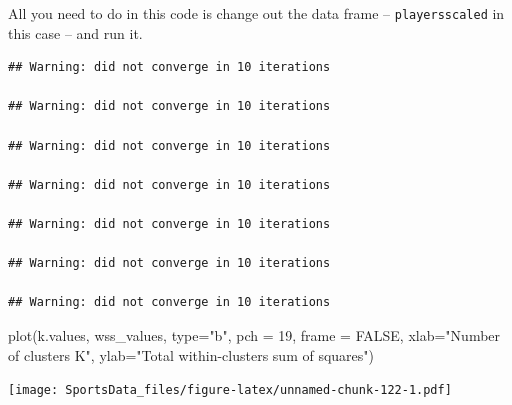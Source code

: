 \documentclass[
]{book}
\newenvironment{Shaded}{\begin{snugshade}}{\end{snugshade}}
\newcommand{\AttributeTok}[1]{\textcolor[rgb]{0.77,0.63,0.00}{#1}}
\newcommand{\CommentTok}[1]{\textcolor[rgb]{0.56,0.35,0.01}{\textit{#1}}}
\newcommand{\ConstantTok}[1]{\textcolor[rgb]{0.00,0.00,0.00}{#1}}
\newcommand{\ControlFlowTok}[1]{\textcolor[rgb]{0.13,0.29,0.53}{\textbf{#1}}}
\newcommand{\DecValTok}[1]{\textcolor[rgb]{0.00,0.00,0.81}{#1}}
\newcommand{\FunctionTok}[1]{\textcolor[rgb]{0.00,0.00,0.00}{#1}}
\newcommand{\NormalTok}[1]{#1}
\newcommand{\OtherTok}[1]{\textcolor[rgb]{0.56,0.35,0.01}{#1}}
\newcommand{\SpecialCharTok}[1]{\textcolor[rgb]{0.00,0.00,0.00}{#1}}
\newcommand{\StringTok}[1]{\textcolor[rgb]{0.31,0.60,0.02}{#1}}
\begin{document}
All you need to do in this code is change out the data frame -- \texttt{playersscaled} in this case -- and run it.

\begin{Shaded}
\end{Shaded}

\begin{verbatim}
## Warning: did not converge in 10 iterations

## Warning: did not converge in 10 iterations

## Warning: did not converge in 10 iterations

## Warning: did not converge in 10 iterations

## Warning: did not converge in 10 iterations

## Warning: did not converge in 10 iterations

## Warning: did not converge in 10 iterations
\end{verbatim}

\begin{Shaded}
\begin{Highlighting}[]
\FunctionTok{plot}\NormalTok{(k.values, wss\_values,}
       \AttributeTok{type=}\StringTok{"b"}\NormalTok{, }\AttributeTok{pch =} \DecValTok{19}\NormalTok{, }\AttributeTok{frame =} \ConstantTok{FALSE}\NormalTok{, }
       \AttributeTok{xlab=}\StringTok{"Number of clusters K"}\NormalTok{,}
       \AttributeTok{ylab=}\StringTok{"Total within{-}clusters sum of squares"}\NormalTok{)}
\end{Highlighting}
\end{Shaded}

\texttt{[image: SportsData\_files/figure-latex/unnamed-chunk-122-1.pdf]}
\end{document}
